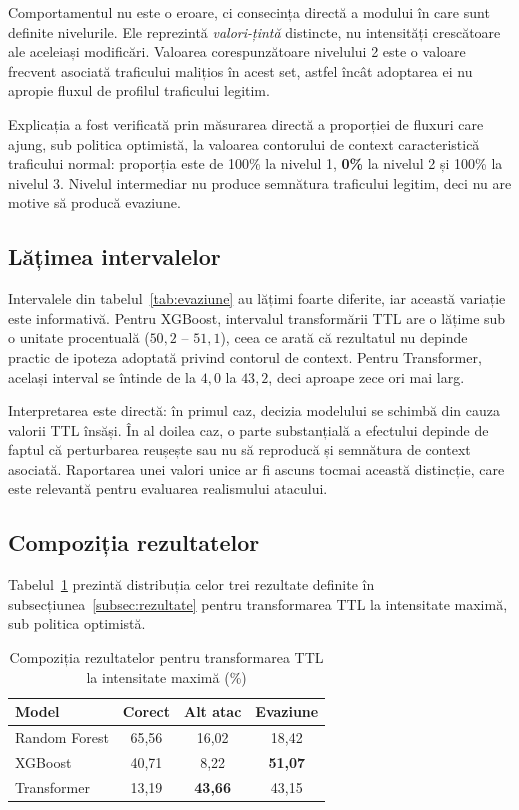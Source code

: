 Comportamentul nu este o eroare, ci consecința directă a modului în care sunt definite nivelurile. Ele reprezintă \emph{valori-țintă} distincte, nu intensități crescătoare ale aceleiași modificări. Valoarea corespunzătoare nivelului 2 este o valoare frecvent asociată traficului malițios în acest set, astfel încât adoptarea ei nu apropie fluxul de profilul traficului legitim.

Explicația a fost verificată prin măsurarea directă a proporției de fluxuri care ajung, sub politica optimistă, la valoarea contorului de context caracteristică traficului normal: proporția este de 100\% la nivelul 1, \textbf{0\%} la nivelul 2 și 100\% la nivelul 3. Nivelul intermediar nu produce semnătura traficului legitim, deci nu are motive să producă evaziune.

\subsection{Lățimea intervalelor}\label{subsec:latime}

Intervalele din tabelul~\ref{tab:evaziune} au lățimi foarte diferite, iar această variație este informativă. Pentru XGBoost, intervalul transformării TTL are o lățime sub o unitate procentuală ($50{,}2$ -- $51{,}1$), ceea ce arată că rezultatul nu depinde practic de ipoteza adoptată privind contorul de context. Pentru Transformer, același interval se întinde de la $4{,}0$ la $43{,}2$, deci aproape zece ori mai larg.

Interpretarea este directă: în primul caz, decizia modelului se schimbă din cauza valorii TTL însăși. În al doilea caz, o parte substanțială a efectului depinde de faptul că perturbarea reușește sau nu să reproducă și semnătura de context asociată. Raportarea unei valori unice ar fi ascuns tocmai această distincție, care este relevantă pentru evaluarea realismului atacului.

\subsection{Compoziția rezultatelor}\label{subsec:compozitie}

Tabelul~\ref{tab:compozitie} prezintă distribuția celor trei rezultate definite în subsecțiunea~\ref{subsec:rezultate} pentru transformarea TTL la intensitate maximă, sub politica optimistă.

\begin{table}[!ht]
    \caption{Compoziția rezultatelor pentru transformarea TTL la intensitate maximă (\%)}
    \centering
    \begin{tabular}{|l|c|c|c|}
        \hline
        \textbf{Model} & \textbf{Corect} & \textbf{Alt atac} & \textbf{Evaziune} \\
        \hline
        Random Forest & 65,56 & 16,02 & 18,42 \\
        \hline
        XGBoost & 40,71 & 8,22 & \textbf{51,07} \\
        \hline
        Transformer & 13,19 & \textbf{43,66} & 43,15 \\
        \hline
    \end{tabular}
    \label{tab:compozitie}
\end{table}

